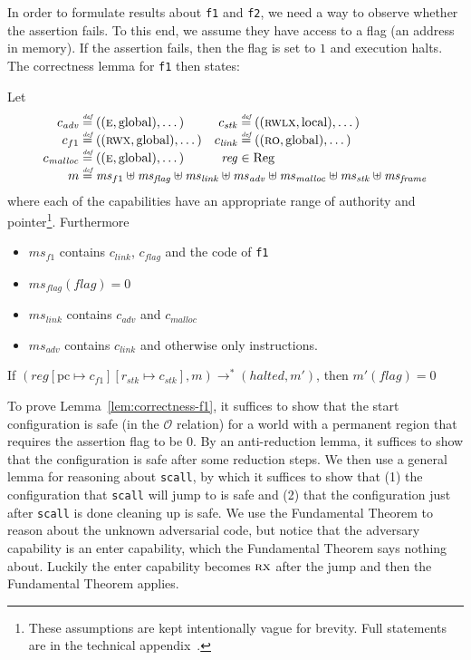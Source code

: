 \documentclass{llncs}
\newcommand{\update}[2]{[#1 \mapsto #2]}
\newcommand{\defeq}{\stackrel{\textit{\tiny{def}}}{=}}
\newcommand{\var}[1]{\mathit{#1}}
\newcommand{\hs}{\var{ms}}
\newcommand{\ms}{\hs}
\newcommand{\pcreg}{\mathrm{pc}}
\newcommand{\reg}{\var{reg}}
\newcommand{\adv}{\var{adv}}
\newcommand{\link}{\var{link}}
\newcommand{\stk}{\var{stk}}
\newcommand{\flag}{\var{flag}}
\newcommand{\halted}{\mathit{halted}}
\newcommand{\codelabel}[1]{\mathit{#1}}
\newcommand{\malloc}{\codelabel{malloc}}
\newcommand{\plaindom}[1]{\mathrm{#1}}
\newcommand{\Regs}{\plaindom{Reg}}
\newcommand{\observations}{\mathcal{O}}
\newcommand{\plainperm}[1]{\textsc{#1}}
\newcommand{\readonly}{\plainperm{ro}}
\newcommand{\exec}{\plainperm{rx}}
\newcommand{\entry}{\plainperm{e}}
\newcommand{\rwx}{\plainperm{rwx}}
\newcommand{\rwlx}{\plainperm{rwlx}}
\newcommand{\plainlocality}[1]{\mathrm{#1}}
\newcommand{\local}{\plainlocality{local}}
\newcommand{\glob}{\plainlocality{global}}
\newcommand{\step}[1][]{\rightarrow_{#1}}
\begin{document}
In order to formulate results about \texttt{\footnotesize{f1}} and
\texttt{\footnotesize{f2}}, we need a way to observe whether the assertion
fails. To this end, we assume they have access to a flag (an address in memory).
If the assertion fails, then the flag is set to $1$ and execution halts. The correctness lemma
for \texttt{\footnotesize{f1}} then states:
\begin{lemma}
  \label{lem:correctness-f1}
  Let
\[
    \begin{array}{r@{}lr@{}l}
    c_\adv & \;\defeq ((\entry,\glob),\dots) & c_{\var{stk}} & \;\defeq ((\rwlx,\local),\dots)\\
    c_{f1} & \;\defeq ((\rwx,\glob),\dots) & c_\link &\; \defeq ((\readonly,\glob),\dots)\\
    c_\malloc &\; \defeq ((\entry,\glob),\dots) & \reg& \; \in \Regs \\
    m &  \multicolumn{3}{@{}l}{\;\defeq \ms_{f1} \uplus \ms_\flag \uplus \ms_{\var{link}} \uplus \hs_\adv \uplus \ms_{\malloc} \uplus \ms_{\var{stk}} \uplus \ms_{\var{frame}}} \\
    \end{array}
\]
where each of the capabilities have an appropriate range of authority and
pointer\footnote{These assumptions are kept intentionally vague for brevity.
  Full statements are in the technical appendix~\cite{technical_appendix}.}.
Furthermore
  \begin{itemize}
  \item $\ms_{f1}$ contains $c_\link$, $c_\flag$ and the code of \texttt{\footnotesize{f1}}
  \item $\ms_\flag(\flag) = 0$
  \item $\ms_{\var{link}}$ contains $c_\adv$ and $c_\malloc$
  \item $\hs_\adv$ contains $c_\link$ and otherwise only instructions.
  \end{itemize}
  If $(\reg\update{\pcreg}{c_{f1}}\update{r_\stk}{c_\stk},m) \step^* (\halted,m')$,
  then $m'(\flag) = 0$
\end{lemma}

To prove Lemma~\ref{lem:correctness-f1}, it suffices to show that the start
configuration is safe (in the $\observations$ relation) for a world with a
permanent region that requires the assertion flag to be 0. By an anti-reduction
lemma, it suffices to show that the configuration is safe after some reduction
steps. We then use a general lemma for reasoning about
\texttt{\footnotesize{scall}}, by which it suffices to show that (1) the
configuration that \texttt{\footnotesize{scall}} will jump to is safe and (2)
that the configuration just after \texttt{\footnotesize{scall}} is done cleaning
up is safe. We use the Fundamental Theorem to reason about the unknown
adversarial code, but notice that the adversary capability is an enter
capability, which the Fundamental Theorem says nothing about. Luckily the enter
capability becomes $\exec$ after the jump and then the Fundamental Theorem
applies.
\end{document}
